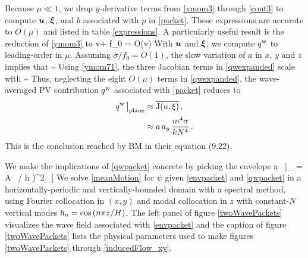 \documentclass[12pt, oneside]{book}
\begin{document}
Because $\mu \ll 1$, we drop $y$-derivative terms from \eqref{xmom3} through \eqref{cont3} to compute $\boldsymbol u$, $\boldsymbol {\xi}$, and $b$ associated with $p$ in \eqref{packet}.  These expressions are accurate to $O(\mu)$ and listed in table \ref{expressions}.  A particularly useful result is the reduction of \eqref{ymom3} to
\beq
v+ f_0 \xi = O(\mu v)\per
\label{ymom71}
\eeq
With $\boldsymbol u$ and $\boldsymbol {\xi}$, we compute $q^{\mathrm{w}}$ to leading-order in $\mu$.  Assuming $\sigma /f_0 = O(1)$, the slow variation of $a$ in $x$, $y$ and $z$  implies that 
\beq
{} \sim \mu \per
\eeq
Using \eqref{ymom71}, the three Jacobian terms in \eqref{qwexpanded} scale with
\beq
  \sim  \mu \per \label{bigFrac}
\eeq
  Thus, neglecting the eight  $O(\mu)$ terms in \eqref{qwexpanded}, the wave-averaged PV contribution $q^{\mathrm{w}}$ associated with \eqref{packet} reduces to 
\begin{align}
q^{\mathrm{w}} \, \big |_{\mathrm{plane}} &\approx \overline{ \mathrm{J}(u,\xi) } \, , \\
&\approx a \, a_y \,\frac{m^4 \sigma}{k N^4} \, . 
\label{qwpacket}
\end{align}
This is the conclusion  reached by BM in their equation (9.22).

We make the implications of \eqref{qwpacket} concrete by picking the envelope
\beq
a \, \big |_{}  = A \, \exp \left[ - \left ( x / 2 \ell \right )^2 - \left ( y / \ell \right )^2 - \big ( [z+H/2] / h \big )^2 \, \right ]  \per
\label{envpacket}
\eeq
We solve \eqref{meanMotion} for $\psi$ given \eqref{envpacket} and \eqref{qwpacket} in a horizontally-periodic and vertically-bounded domain with a spectral method, using Fourier collocation in $(x,y)$ and modal collocation in $z$ with constant-$N$ vertical modes $\mathsf{h}_n = \cos \left ( n \pi z / H \right )$.  The left panel of figure \ref{twoWavePackets} visualizes the wave field associated with \eqref{envpacket} and the caption of figure \ref{twoWavePackets} lists the physical parameters used to make figures \ref{twoWavePackets} through \ref{inducedFlow_xy}.
\end{document}
